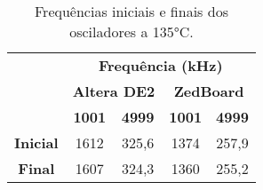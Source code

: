 \begin{table}[H]
\centering
\caption{Frequências iniciais e finais dos osciladores a 135°C.}
\begin{tabular}{l|cccc|}
\cline{2-5}
 & \multicolumn{4}{c|}{\textbf{Frequência (kHz)}} \\ \cline{2-5} 
 & \multicolumn{2}{c|}{\textbf{Altera DE2}} & \multicolumn{2}{c|}{\textbf{ZedBoard}} \\ \cline{2-5} 
 & \multicolumn{1}{c|}{\textbf{1001}} & \multicolumn{1}{c|}{\textbf{4999}} & \multicolumn{1}{c|}{\textbf{1001}} & \textbf{4999} \\ \hline
\multicolumn{1}{|c|}{\textbf{Inicial}} & \multicolumn{1}{c|}{1612} & \multicolumn{1}{c|}{325,6} & \multicolumn{1}{c|}{1374} & 257,9 \\ \hline
\multicolumn{1}{|c|}{\textbf{Final}} & \multicolumn{1}{c|}{1607} & \multicolumn{1}{c|}{324,3} & \multicolumn{1}{c|}{1360} & 255,2 \\ \hline
\end{tabular}
\label{tab:FreqT135}
\end{table}